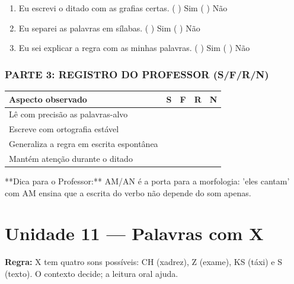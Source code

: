 \begin{exercicio}
\begin{enumerate}[label=\alph*)]
  \item Eu escrevi o ditado com as grafias certas.  \quad ( ) Sim   ( ) Não

  \item Eu separei as palavras em sílabas.  \quad ( ) Sim   ( ) Não

  \item Eu sei explicar a regra com as minhas palavras.  \quad ( ) Sim   ( ) Não

\end{enumerate}

\subsection*{PARTE 3: REGISTRO DO PROFESSOR (S/F/R/N)}

\begin{center}
\renewcommand{\arraystretch}{1.4}
\begin{tabular}{@{}p{9cm}cccc@{}}
\toprule
Aspecto observado & S & F & R & N \\
\midrule
Lê com precisão as palavras-alvo & & & & \\
Escreve com ortografia estável & & & & \\
Generaliza a regra em escrita espontânea & & & & \\
Mantém atenção durante o ditado & & & & \\
\bottomrule\end{tabular}\end{center}

\end{exercicio}

\begin{dica}
**Dica para o Professor:** AM/AN é a porta para a morfologia: 'eles cantam' com AM ensina que a escrita do verbo não depende do som apenas.
\end{dica}


\chapter{Unidade 11 --- Palavras com X}


\textbf{Regra:} X tem quatro sons possíveis: CH (xadrez), Z (exame), KS (táxi) e S (texto). O contexto decide; a leitura oral ajuda.


